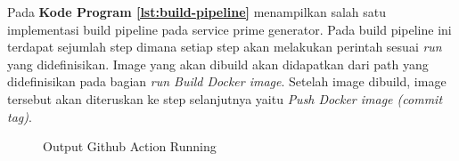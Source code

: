 Pada \textbf{Kode Program \ref{lst:build-pipeline}} menampilkan salah satu
implementasi build pipeline pada service prime generator. Pada build pipeline
ini terdapat sejumlah step dimana setiap step akan melakukan perintah sesuai
\textit{run} yang didefinisikan. Image yang akan dibuild akan didapatkan dari
path yang didefinisikan pada bagian \textit{run Build Docker image}. Setelah
image dibuild, image tersebut akan diteruskan ke step selanjutnya yaitu
\textit{Push Docker image (commit tag)}.
\begin{figure}[H]
  \centering
  \caption{Output Github Action Running}
  \label{fig:output_github_action_running}
\end{figure}

